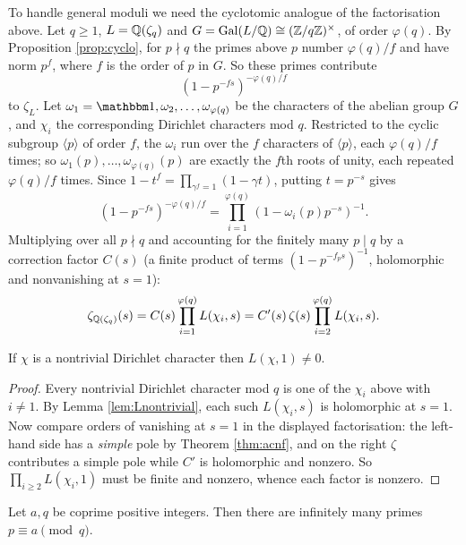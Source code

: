 \documentclass[a4paper]{scrartcl}
\newcommand{\Gal}{\operatorname{Gal}}
\begin{document}
To handle general moduli we need the cyclotomic analogue of the factorisation above. Let $q \geq 1$, $L = \mathbb{Q}(\zeta_q)$ and $G = \Gal(L/\Q) \cong (\Z/q\Z)^\times$, of order $\varphi(q)$. By Proposition \ref{prop:cyclo}, for $p \nmid q$ the primes above $p$ number $\varphi(q)/f$ and have norm $p^f$, where $f$ is the order of $p$ in $G$. So these primes contribute
$$\left(1-p^{-fs}\right)^{-\varphi(q)/f}$$
to $\zeta_L$. Let $\omega_1 = \mathbbm 1,\omega_2,\dots,\omega_{\varphi(q)}$ be the characters of the abelian group $G$, and $\chi_i$ the corresponding Dirichlet characters mod $q$. Restricted to the cyclic subgroup $\langle p\rangle$ of order $f$, the $\omega_i$ run over the $f$ characters of $\langle p \rangle$, each $\varphi(q)/f$ times; so $\omega_1(p),\dots,\omega_{\varphi(q)}(p)$ are exactly the $f$th roots of unity, each repeated $\varphi(q)/f$ times. Since $1-t^f = \prod_{\gamma^f=1}(1-\gamma t)$, putting $t = p^{-s}$ gives
$$\left(1-p^{-fs}\right)^{-\varphi(q)/f} = \prod_{i=1}^{\varphi(q)}\left(1-\omega_i(p)p^{-s}\right)^{-1}.$$
Multiplying over all $p \nmid q$ and accounting for the finitely many $p \mid q$ by a correction factor $C(s)$ (a finite product of terms $(1-p^{-f_ps})^{-1}$, holomorphic and nonvanishing at $s=1$):
$$\zeta_{\mathbb{Q}(\zeta_q)}(s) = C(s)\prod_{i=1}^{\varphi(q)}L(\chi_i,s) = C'(s)\,\zeta(s)\prod_{i=2}^{\varphi(q)}L(\chi_i,s).$$

\begin{theorem}\label{thm:Lnonzero}
	If $\chi$ is a nontrivial Dirichlet character then $L(\chi,1) \neq 0$.
\end{theorem}

\begin{proof}
	Every nontrivial Dirichlet character mod $q$ is one of the $\chi_i$ above with $i \neq 1$. By Lemma \ref{lem:Lnontrivial}, each such $L(\chi_i,s)$ is holomorphic at $s = 1$. Now compare orders of vanishing at $s = 1$ in the displayed factorisation: the left-hand side has a \emph{simple} pole by Theorem \ref{thm:acnf}, and on the right $\zeta$ contributes a simple pole while $C'$ is holomorphic and nonzero. So $\prod_{i\ge2}L(\chi_i,1)$ must be finite and nonzero, whence each factor is nonzero.
\end{proof}

\begin{theorem}[Dirichlet]\label{thm:primesAP}
	Let $a, q$ be coprime positive integers. Then there are infinitely many primes $p \equiv a \pmod q$.
\end{theorem}
\end{document}
